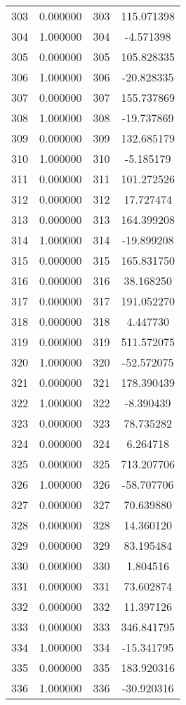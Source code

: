 \documentclass[12pt]{article}
\begin{document}
\begin{longtable}{@{}cccc@{}}
303 & 0.000000 & 303 & 115.071398 \\
304 & 1.000000 & 304 & -4.571398 \\
305 & 0.000000 & 305 & 105.828335 \\
306 & 1.000000 & 306 & -20.828335 \\
307 & 0.000000 & 307 & 155.737869 \\
308 & 1.000000 & 308 & -19.737869 \\
309 & 0.000000 & 309 & 132.685179 \\
310 & 1.000000 & 310 & -5.185179 \\
311 & 0.000000 & 311 & 101.272526 \\
312 & 0.000000 & 312 & 17.727474 \\
313 & 0.000000 & 313 & 164.399208 \\
314 & 1.000000 & 314 & -19.899208 \\
315 & 0.000000 & 315 & 165.831750 \\
316 & 0.000000 & 316 & 38.168250 \\
317 & 0.000000 & 317 & 191.052270 \\
318 & 0.000000 & 318 & 4.447730 \\
319 & 0.000000 & 319 & 511.572075 \\
320 & 1.000000 & 320 & -52.572075 \\
321 & 0.000000 & 321 & 178.390439 \\
322 & 1.000000 & 322 & -8.390439 \\
323 & 0.000000 & 323 & 78.735282 \\
324 & 0.000000 & 324 & 6.264718 \\
325 & 0.000000 & 325 & 713.207706 \\
326 & 1.000000 & 326 & -58.707706 \\
327 & 0.000000 & 327 & 70.639880 \\
328 & 0.000000 & 328 & 14.360120 \\
329 & 0.000000 & 329 & 83.195484 \\
330 & 0.000000 & 330 & 1.804516 \\
331 & 0.000000 & 331 & 73.602874 \\
332 & 0.000000 & 332 & 11.397126 \\
333 & 0.000000 & 333 & 346.841795 \\
334 & 1.000000 & 334 & -15.341795 \\
335 & 0.000000 & 335 & 183.920316 \\
336 & 1.000000 & 336 & -30.920316 \\

\end{longtable}
\end{document}
